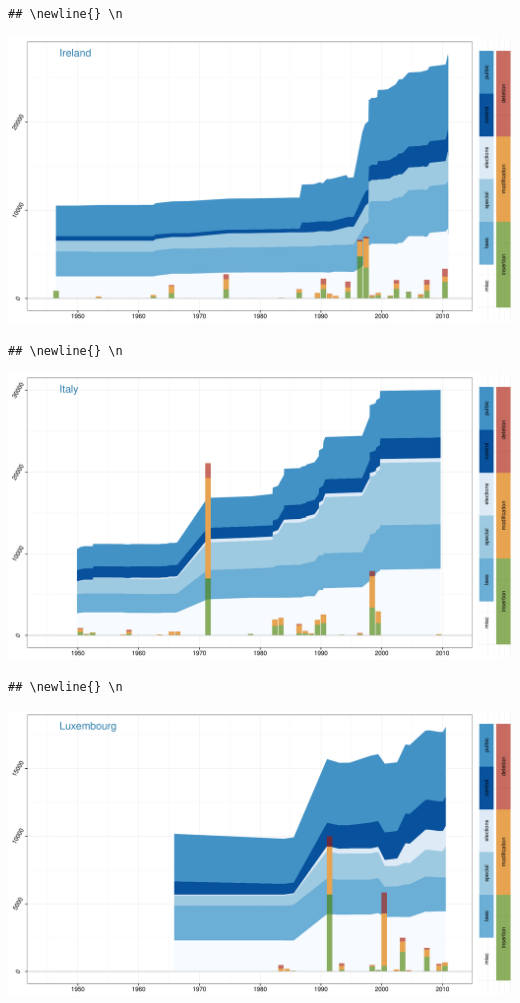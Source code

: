 \documentclass[a4paper, landscape]{article}
\begin{document}
\begin{verbatim}
## \newline{} \n
\end{verbatim}

\includegraphics{country_graphs_files/figure-latex/unnamed-chunk-3-10.pdf}\\

\begin{verbatim}
## \newline{} \n
\end{verbatim}

\includegraphics{country_graphs_files/figure-latex/unnamed-chunk-3-11.pdf}\\

\begin{verbatim}
## \newline{} \n
\end{verbatim}

\includegraphics{country_graphs_files/figure-latex/unnamed-chunk-3-12.pdf}\\
\end{document}
